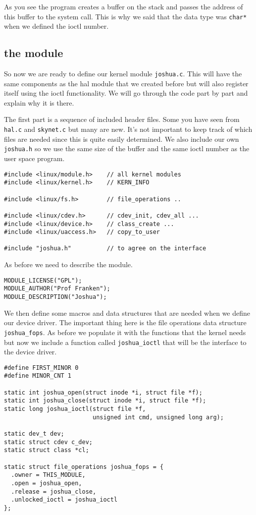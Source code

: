 \documentclass[a4paper,11pt]{article}
\begin{document}
As you see the program creates a buffer on the stack and passes the
address of this buffer to the system call. This is why we said that
the data type was {\tt char*} when we defined the ioctl number.

\subsection{the module}

So now we are ready to define our kernel module {\tt joshua.c}. This
will have the same components as the hal module that we created before
but will also register itself using the ioctl functionality. We will
go through the code part by part and explain why it is there.

The first part is a sequence of included header files. Some you have
seen from {\tt hal.c} and {\tt skynet.c} but many are new. It's not
important to keep track of which files are needed since this is quite
easily determined. We also include our own {\tt joshua.h} so we use
the same size of the buffer and the same ioctl number as the user
space program.

\begin{lstlisting}
#include <linux/module.h>    // all kernel modules
#include <linux/kernel.h>    // KERN_INFO

#include <linux/fs.h>        // file_operations ..

#include <linux/cdev.h>      // cdev_init, cdev_all ...
#include <linux/device.h>    // class_create ...
#include <linux/uaccess.h>   // copy_to_user

#include "joshua.h"          // to agree on the interface 
\end{lstlisting}

As before we need to describe the module. 

\begin{lstlisting}
MODULE_LICENSE("GPL");
MODULE_AUTHOR("Prof Franken");
MODULE_DESCRIPTION("Joshua");
\end{lstlisting}

We then define some macros and data structures that are needed when we
define our device driver. The important thing here is the file
operations data structure {\tt joshua\_fops}. As before we populate it
with the functions that the kernel needs but now we include a function
called {\tt joshua\_ioctl} that will be the interface to the device driver.

\begin{lstlisting} 
#define FIRST_MINOR 0
#define MINOR_CNT 1

static int joshua_open(struct inode *i, struct file *f);
static int joshua_close(struct inode *i, struct file *f);
static long joshua_ioctl(struct file *f, 
                         unsigned int cmd, unsigned long arg);

static dev_t dev;
static struct cdev c_dev;
static struct class *cl;
 
static struct file_operations joshua_fops = {
  .owner = THIS_MODULE,
  .open = joshua_open,
  .release = joshua_close,
  .unlocked_ioctl = joshua_ioctl
};
\end{lstlisting}
\end{document}
